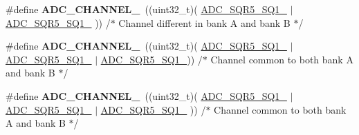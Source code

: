 \begin{DoxyCompactItemize}
\item 
\hypertarget{group___a_d_c__channels_gad5ff4f4f0e5f6f9ffbdfb6f4cbc3a6e0}{\#define {\bfseries A\-D\-C\-\_\-\-C\-H\-A\-N\-N\-E\-L\-\_}~((uint32\-\_\-t)(                 \hyperlink{group___peripheral___registers___bits___definition_ga7aeddef7b3153a014f66e11e72dd0bba}{A\-D\-C\-\_\-\-S\-Q\-R5\-\_\-\-S\-Q1\-\_} $\vert$ \hyperlink{group___peripheral___registers___bits___definition_ga4e21c2a89e71e60406cacb23de6f6597}{A\-D\-C\-\_\-\-S\-Q\-R5\-\_\-\-S\-Q1\-\_}                                  ))  /$\ast$ Channel different in bank A and bank B $\ast$/}\label{group___a_d_c__channels_gad5ff4f4f0e5f6f9ffbdfb6f4cbc3a6e0}

\item 
\hypertarget{group___a_d_c__channels_gad7550270d90a1a12b00cd9f8ad9f1fc2}{\#define {\bfseries A\-D\-C\-\_\-\-C\-H\-A\-N\-N\-E\-L\-\_}~((uint32\-\_\-t)(                 \hyperlink{group___peripheral___registers___bits___definition_ga7aeddef7b3153a014f66e11e72dd0bba}{A\-D\-C\-\_\-\-S\-Q\-R5\-\_\-\-S\-Q1\-\_} $\vert$ \hyperlink{group___peripheral___registers___bits___definition_ga4e21c2a89e71e60406cacb23de6f6597}{A\-D\-C\-\_\-\-S\-Q\-R5\-\_\-\-S\-Q1\-\_}                  $\vert$ \hyperlink{group___peripheral___registers___bits___definition_ga6d7b92bf8ba789b76256e205988cc8de}{A\-D\-C\-\_\-\-S\-Q\-R5\-\_\-\-S\-Q1\-\_}))  /$\ast$ Channel common to both bank A and bank B $\ast$/}\label{group___a_d_c__channels_gad7550270d90a1a12b00cd9f8ad9f1fc2}

\item 
\hypertarget{group___a_d_c__channels_ga9caff32bcda5dd83f662bf398ab14d36}{\#define {\bfseries A\-D\-C\-\_\-\-C\-H\-A\-N\-N\-E\-L\-\_}~((uint32\-\_\-t)(                 \hyperlink{group___peripheral___registers___bits___definition_ga7aeddef7b3153a014f66e11e72dd0bba}{A\-D\-C\-\_\-\-S\-Q\-R5\-\_\-\-S\-Q1\-\_} $\vert$ \hyperlink{group___peripheral___registers___bits___definition_ga4e21c2a89e71e60406cacb23de6f6597}{A\-D\-C\-\_\-\-S\-Q\-R5\-\_\-\-S\-Q1\-\_} $\vert$ \hyperlink{group___peripheral___registers___bits___definition_ga374490cc8d96ed0a40d3f212bc6fd6d1}{A\-D\-C\-\_\-\-S\-Q\-R5\-\_\-\-S\-Q1\-\_}                 ))  /$\ast$ Channel common to both bank A and bank B $\ast$/}\label{group___a_d_c__channels_ga9caff32bcda5dd83f662bf398ab14d36}


\end{DoxyCompactItemize}
